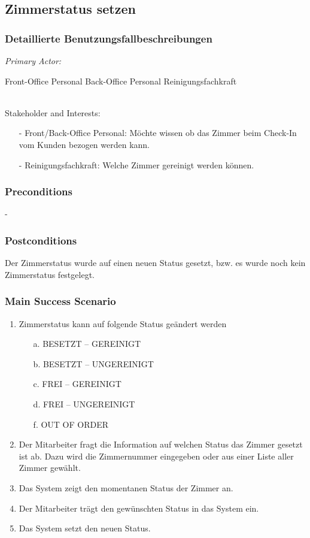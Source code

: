 \documentclass[./detailed_overview_usecases.tex]{subfiles}
\begin{document}
    \subsection{Zimmerstatus setzen}
    \subsubsection{Detaillierte Benutzungsfallbeschreibungen}
    \textit{Primary Actor:}
    \begin{enumerate}
        Front-Office Personal
        Back-Office Personal
        Reinigungsfachkraft
    \end{enumerate}
    \\
    Stakeholder and Interests:
    \begin{itemize}
        \item[-] Front/Back-Office Personal: Möchte wissen ob das Zimmer beim Check-In vom Kunden bezogen werden kann.
        \item[-] Reinigungsfachkraft: Welche Zimmer gereinigt werden können.
    \end{itemize}

    \subsubsection*{Preconditions}
    -
    \subsubsection*{Postconditions}
    Der Zimmerstatus wurde auf einen neuen Status gesetzt, bzw. es wurde noch kein Zimmerstatus festgelegt.

    \subsubsection*{Main Success Scenario}
    \begin{enumerate}
        \item Zimmerstatus kann auf folgende Status geändert werden
        \begin{itemize}
            \item[a.] BESETZT – GEREINIGT
            \item[b.] BESETZT – UNGEREINIGT
            \item[c.] FREI – GEREINIGT
            \item[d.] FREI – UNGEREINIGT
            \item[f.] OUT OF ORDER
        \end{itemize}
        \item Der Mitarbeiter fragt die Information auf welchen Status das Zimmer gesetzt ist ab. Dazu wird die Zimmernummer eingegeben oder aus einer Liste aller Zimmer gewählt.
        \item Das System zeigt den momentanen Status der Zimmer an.
        \item Der Mitarbeiter trägt den gewünschten Status in das System ein.
        \item Das System setzt den neuen Status.
    \end{enumerate}
\end{document}
